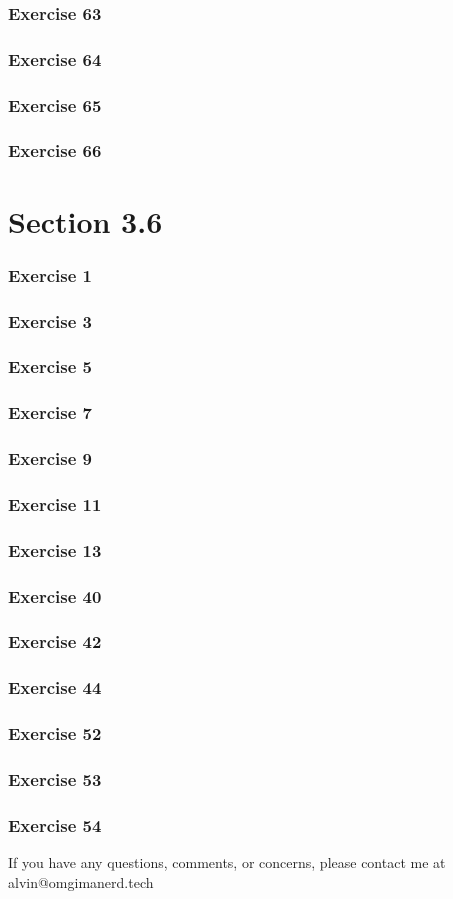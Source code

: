 \documentclass[letterpaper, 12pt]{math}
\begin{document}
\subsubsection*{Exercise 63}
\subsubsection*{Exercise 64}
\subsubsection*{Exercise 65}
\subsubsection*{Exercise 66}

\section*{Section 3.6}
\subsubsection*{Exercise 1}
\subsubsection*{Exercise 3}
\subsubsection*{Exercise 5}
\subsubsection*{Exercise 7}
\subsubsection*{Exercise 9}
\subsubsection*{Exercise 11}
\subsubsection*{Exercise 13}
\subsubsection*{Exercise 40}
\subsubsection*{Exercise 42}
\subsubsection*{Exercise 44}
\subsubsection*{Exercise 52}
\subsubsection*{Exercise 53}
\subsubsection*{Exercise 54}

\begin{center}
  If you have any questions, comments, or concerns, please contact me at
  alvin@omgimanerd.tech
\end{center}
\end{document}
